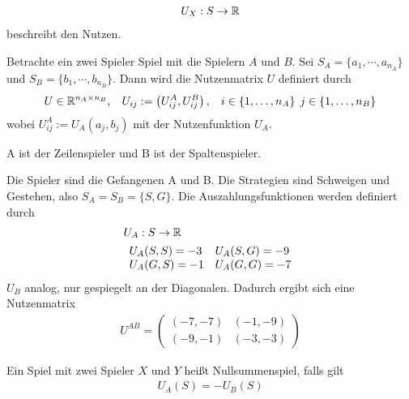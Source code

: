 \begin{defi}[Auszahlungsfunktion]
	\begin{align*}
		U_X: S \rightarrow \mathbb{R}
	\end{align*}
	beschreibt den Nutzen. 
\end{defi}

\begin{defi}[Nutzenmatrix]
	Betrachte ein zwei Spieler Spiel mit die Spielern $A$ und $B$. Sei $S_A=\{a_1, \cdots, a_{n_A}\}$ und $S_B=\{b_1, \cdots, b_{n_B}\}$. Dann wird die Nutzenmatrix $U$ definiert durch
	\begin{align*}
		U \in \mathbb{R}^{n_A \times n_B}, \hspace{2ex} U_{ij}:=\left( U_{ij}^A, U_{ij}^B \right), \hspace{2ex} i \in \{ 1,\dots, n_A \} \hspace{1ex} j \in \{ 1, \dots, n_B\}
	\end{align*} 
	wobei $U_{ij}^A:=U_A(a_j,b_j)$ mit der Nutzenfunktion $U_A$.  
\end{defi}
\begin{noti}
	A ist der Zeilenspieler und B ist der Spaltenspieler. 
\end{noti}

\begin{bsp}[Gefangenendilemma]
	Die Spieler sind die Gefangenen A und B. Die Strategien sind Schweigen und Gestehen, also $S_A=S_B=\{S,G\}$. Die Auszahlungsfunktionen werden definiert durch
	\begin{align*}
	& 	U_A:S \rightarrow \mathbb{R} \\
	& 	\begin{array}{ll}
			U_A(S,S)= -3 & U_A(S,G)=-9 \\
			U_A(G,S)= -1 & U_A(G,G)=-7 \\ 
		\end{array}
	\end{align*}
	$U_B$ analog, nur gespiegelt an der Diagonalen. Dadurch ergibt sich eine Nutzenmatrix
	\begin{align*}
		U^{AB}= 
		\begin{pmatrix}
			(-7,-7) & (-1,-9) \\
			(-9,-1) & (-3,-3) 
		\end{pmatrix}
	\end{align*}
\end{bsp}

\begin{defi}[Nullsummenspiel]
	Ein Spiel mit zwei Spieler $X$ und $Y$ heißt Nullsummenspiel, falls gilt 
	\begin{align*}
		U_A(S)=-U_B(S)
	\end{align*}
\end{defi}


